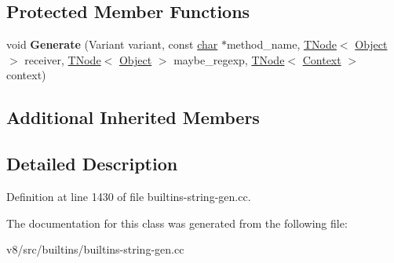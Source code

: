 \subsection*{Protected Member Functions}
\begin{DoxyCompactItemize}
\item 
\mbox{\label{classv8_1_1internal_1_1StringMatchSearchAssembler_a7123d185921ef66584688f5f31c89290}} 
void {\bfseries Generate} (Variant variant, const \mbox{\hyperlink{classchar}{char}} $\ast$method\+\_\+name, \mbox{\hyperlink{classv8_1_1internal_1_1compiler_1_1TNode}{T\+Node}}$<$ \mbox{\hyperlink{classv8_1_1internal_1_1Object}{Object}} $>$ receiver, \mbox{\hyperlink{classv8_1_1internal_1_1compiler_1_1TNode}{T\+Node}}$<$ \mbox{\hyperlink{classv8_1_1internal_1_1Object}{Object}} $>$ maybe\+\_\+regexp, \mbox{\hyperlink{classv8_1_1internal_1_1compiler_1_1TNode}{T\+Node}}$<$ \mbox{\hyperlink{classv8_1_1internal_1_1Context}{Context}} $>$ context)
\end{DoxyCompactItemize}
\subsection*{Additional Inherited Members}


\subsection{Detailed Description}


Definition at line 1430 of file builtins-\/string-\/gen.\+cc.



The documentation for this class was generated from the following file\+:\begin{DoxyCompactItemize}
\item 
v8/src/builtins/builtins-\/string-\/gen.\+cc\end{DoxyCompactItemize}

